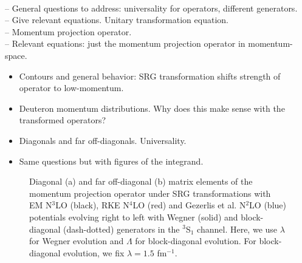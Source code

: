 \documentclass[preprintnumbers,floatfix,aps,prc,preprint,nofootinbib]{revtex4-1}
\begin{document}
\\
-- General questions to address: universality for operators, different generators.
\\
-- Give relevant equations. Unitary transformation equation.
\\
-- Momentum projection operator.
\\
-- Relevant equations: just the momentum projection operator in momentum-space.
%
\begin{itemize}
	\item Contours and general behavior: SRG transformation shifts strength of operator to low-momentum.
	\item Deuteron momentum distributions. Why does this make sense with the transformed operators?
	\item Diagonals and far off-diagonals. Universality.
	\item Same questions but with figures of the integrand.
\end{itemize}
%
\begin{figure}[H]
	\centering
	
	\caption{Diagonal (a) and far off-diagonal (b) matrix elements of the momentum projection operator under SRG transformations with EM N$^3$LO (black), RKE N$^4$LO (red) and Gezerlis et al. N$^2$LO (blue) potentials evolving right to left with Wegner (solid) and block-diagonal (dash-dotted) generators in the $^3$S$_1$ channel. Here, we use $\lambda$ for Wegner evolution and $\Lambda$ for block-diagonal evolution. For block-diagonal evolution, we fix $\lambda=1.5$ fm$^{-1}$.}
	\label{fig:momentum_proj_3S1}
\end{figure}
\end{document}

